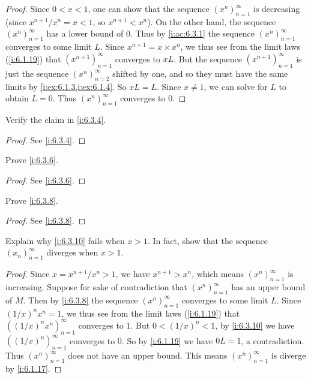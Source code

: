 \begin{proof}
  Since \(0 < x < 1\), one can show that the sequence \((x^n)_{n = 1}^\infty\) is decreasing
  (since \(x^{n + 1} / x^n = x < 1\), so \(x^{n + 1} < x^n\)).
  On the other hand, the sequence \((x^n)_{n = 1}^\infty\) has a lower bound of \(0\).
  Thus by \cref{i:ac:6.3.1} the sequence \((x^n)_{n = 1}^\infty\) converges to some limit \(L\).
  Since \(x^{n + 1} = x \times x^n\), we thus see from the limit laws (\cref{i:6.1.19}) that \((x^{n + 1})_{n = 1}^\infty\) converges to \(xL\).
  But the sequence \((x^{n + 1})_{n = 1}^\infty\) is just the sequence \((x^n)_{n = 2}^\infty\) shifted by one, and so they must have the same limits by \cref{i:ex:6.1.3,i:ex:6.1.4}.
  So \(xL = L\).
  Since \(x \neq 1\), we can solve for \(L\) to obtain \(L = 0\).
  Thus \((x^n)_{n = 1}^\infty\) converges to \(0\).
\end{proof}

\exercisesection

\begin{ex}\label{i:ex:6.3.1}
  Verify the claim in \cref{i:6.3.4}.
\end{ex}

\begin{proof}
  See \cref{i:6.3.4}.
\end{proof}

\begin{ex}\label{i:ex:6.3.2}
  Prove \cref{i:6.3.6}.
\end{ex}

\begin{proof}
  See \cref{i:6.3.6}.
\end{proof}

\begin{ex}\label{i:ex:6.3.3}
  Prove \cref{i:6.3.8}.
\end{ex}

\begin{proof}
  See \cref{i:6.3.8}.
\end{proof}

\begin{ex}\label{i:ex:6.3.4}
  Explain why \cref{i:6.3.10} fails when \(x > 1\).
  In fact, show that the sequence \((x_n)_{n = 1}^\infty\) diverges when \(x > 1\).
\end{ex}

\begin{proof}
  Since \(x = x^{n + 1} / x^n > 1\), we have \(x^{n + 1} > x^n\), which means \((x^n)_{n = 1}^\infty\) is increasing.
  Suppose for sake of contradiction that \((x^n)_{n = 1}^\infty\) has an upper bound of \(M\).
  Then by \cref{i:6.3.8} the sequence \((x^n)_{n = 1}^\infty\) converges to some limit \(L\).
  Since \((1 / x)^n x^n = 1\), we thus see from the limit laws (\cref{i:6.1.19}) that \(((1 / x)^n x^n)_{n = 1}^\infty\) converges to \(1\).
  But \(0 < (1 / x)^n < 1\), by \cref{i:6.3.10} we have \(((1 / x)^n)_{n = 1}^\infty\) converges to \(0\).
  So by \cref{i:6.1.19} we have \(0L = 1\), a contradiction.
  Thus \((x^n)_{n = 1}^\infty\) does not have an upper bound.
  This means \((x^n)_{n = 1}^\infty\) is diverge by \cref{i:6.1.17}.
\end{proof}
